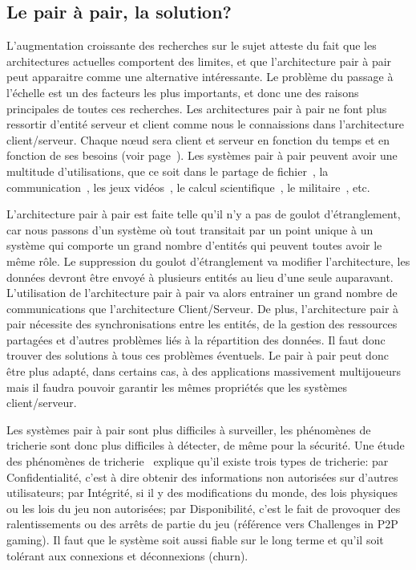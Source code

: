 	\subsection{Le pair à pair, la solution?}
	\par
	L'augmentation croissante des recherches sur le sujet atteste du fait que les architectures actuelles comportent des limites, et que l'architecture pair à pair peut apparaitre comme une alternative intéressante. Le problème du passage à l'échelle est un des facteurs les plus importants, et donc une des raisons principales de toutes ces recherches. Les architectures pair à pair ne font plus ressortir d'entité serveur et client comme nous le connaissions dans l'architecture client/serveur. Chaque nœud sera client et serveur en fonction du temps et en fonction de ses besoins (voir page~\pageref{P2P/ClServ}). Les systèmes pair à pair peuvent avoir une multitude d'utilisations, que ce soit dans le partage de fichier~\cite{gnutella,napster,kazaa}, la communication~\cite{skype}, les jeux vidéos~\cite{starwars}, le calcul scientifique~\cite{Pastry,xtremweb,chord}, le militaire~\cite{jxta}, etc. \\
	\par L'architecture pair à pair est faite telle qu'il n'y a pas de goulot d'étranglement, car nous passons d'un système où tout transitait par un point unique à un système qui comporte un grand nombre d'entités qui peuvent toutes avoir le même rôle. Le suppression du goulot d'étranglement va modifier l'architecture, les données devront être envoyé à plusieurs entités au lieu d'une seule auparavant. L'utilisation de l'architecture pair à pair va alors entrainer un grand nombre de communications que l'architecture Client/Serveur. De plus, l'architecture pair à pair nécessite des synchronisations entre les entités, de la gestion des ressources partagées et d'autres problèmes liés à la répartition des données. Il faut donc trouver des solutions à tous ces problèmes éventuels. Le pair à pair peut donc être plus adapté, dans certains cas, à des applications massivement multijoueurs mais il faudra pouvoir garantir les mêmes propriétés que les systèmes client/serveur. \\
	\par Les systèmes pair à pair sont plus difficiles à surveiller, les phénomènes de tricherie sont donc plus difficiles à détecter, de même pour la sécurité. Une étude des phénomènes de tricherie~\cite{1198269} explique qu'il existe trois types de tricherie: par Confidentialité, c'est à dire obtenir des informations non autorisées sur d'autres utilisateurs; par Intégrité, si il y des modifications du monde, des lois physiques ou les lois du jeu non autorisées; par Disponibilité, c'est le fait de provoquer des ralentissements ou des arrêts de partie du jeu (référence vers Challenges in P2P gaming). Il faut que le système soit aussi fiable sur le long terme et qu'il soit tolérant aux connexions et déconnexions (churn).\\
